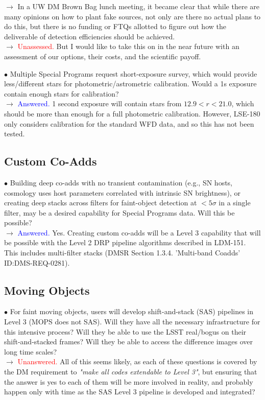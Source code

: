 \documentclass[DM,lsstdraft,toc]{lsstdoc}
\begin{document}
$\rightarrow$ In a UW DM Brown Bag lunch meeting, it became clear that while there are many opinions on how to plant fake sources, not only are there no actual plans to do this, but there is no funding or FTQs allotted to figure out how the deliverable of detection efficiencies should be achieved. \\
$\rightarrow$ \textcolor{red}{Unassessed.} But I would like to take this on in the near future with an assessment of our options, their costs, and the scientific payoff. 

$\bullet$ Multiple Special Programs request short-exposure survey, which would provide less/different stars for photometric/astrometric calibration. Would a 1s exposure contain enough stars for calibration? \\
$\rightarrow$ \textcolor{blue}{Answered.} 1 second exposure will contain stars from $12.9<r<21.0$, which should be more than enough for a full photometric calibration. However, LSE-180 only considers calibration for the standard WFD data, and so this has not been tested.


\subsection{Custom Co-Adds}\label{ssec:issues_coadds}

$\bullet$ Building deep co-adds with no transient contamination (e.g., SN hosts, cosmology uses host parameters correlated with intrinsic SN brightness), or creating deep stacks across filters for faint-object detection at $<5\sigma$ in a single filter, may be a desired capability for Special Programs data. Will this be possible? \\
$\rightarrow$ \textcolor{blue}{Answered.} Yes. Creating custom co-adds will be a Level 3 capability that will be possible with the Level 2 DRP pipeline algorithms described in LDM-151. This includes multi-filter stacks (DMSR Section 1.3.4. 'Multi-band Coadds' ID:DMS-REQ-0281).


\subsection{Moving Objects}\label{ssec:issues_mops}

$\bullet$ For faint moving objects, users will develop shift-and-stack (SAS) pipelines in Level 3 (MOPS does not SAS). Will they have all the necessary infrastructure for this intensive process? Will they be able to use the LSST real/bogus on their shift-and-stacked frames? Will they be able to access the difference images over long time scales? \\
$\rightarrow$ \textcolor{red}{Unanswered.} All of this seems likely, as each of these questions is covered by the DM requirement to {\it "make all codes extendable to Level 3"}, but ensuring that the answer is yes to each of them will be more involved in reality, and probably happen only with time as the SAS Level 3 pipeline is developed and integrated?
\end{document}
